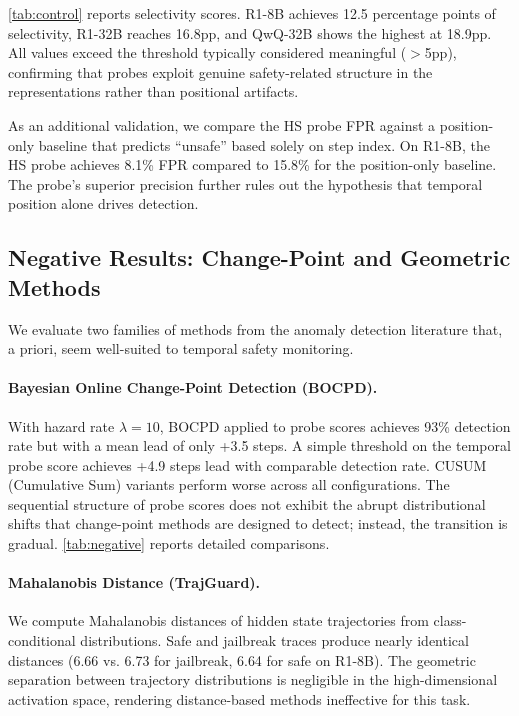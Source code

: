 \cref{tab:control} reports selectivity scores. R1-8B achieves 12.5 percentage points of selectivity, R1-32B reaches 16.8pp, and QwQ-32B shows the highest at 18.9pp. All values exceed the threshold typically considered meaningful ($>$5pp), confirming that probes exploit genuine safety-related structure in the representations rather than positional artifacts.

As an additional validation, we compare the HS probe FPR against a position-only baseline that predicts ``unsafe'' based solely on step index. On R1-8B, the HS probe achieves 8.1\% FPR compared to 15.8\% for the position-only baseline. The probe's superior precision further rules out the hypothesis that temporal position alone drives detection.

\subsection{Negative Results: Change-Point and Geometric Methods}
\label{sec:negative}

We evaluate two families of methods from the anomaly detection literature that, a priori, seem well-suited to temporal safety monitoring.

\paragraph{Bayesian Online Change-Point Detection (BOCPD).} With hazard rate $\lambda{=}10$, BOCPD applied to probe scores achieves 93\% detection rate but with a mean lead of only +3.5 steps. A simple threshold on the temporal probe score achieves +4.9 steps lead with comparable detection rate. CUSUM (Cumulative Sum) variants perform worse across all configurations. The sequential structure of probe scores does not exhibit the abrupt distributional shifts that change-point methods are designed to detect; instead, the transition is gradual. \cref{tab:negative} reports detailed comparisons.

\paragraph{Mahalanobis Distance (TrajGuard).} We compute Mahalanobis distances of hidden state trajectories from class-conditional distributions. Safe and jailbreak traces produce nearly identical distances (6.66 vs. 6.73 for jailbreak, 6.64 for safe on R1-8B). The geometric separation between trajectory distributions is negligible in the high-dimensional activation space, rendering distance-based methods ineffective for this task.

